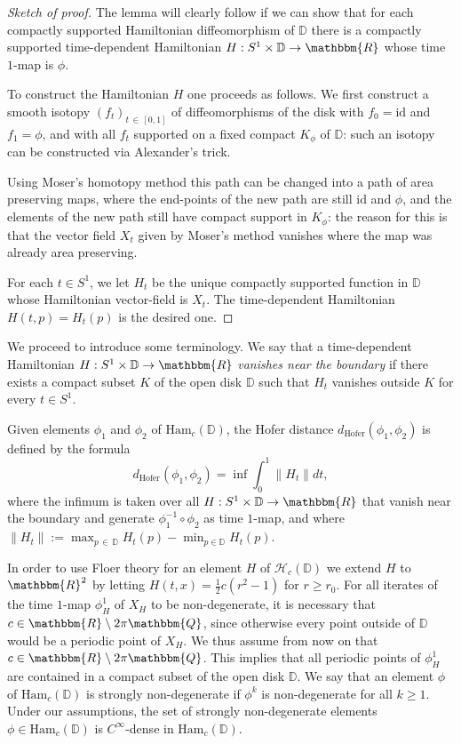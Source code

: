 \documentclass[AHL,Unicode,longabstracts,published]{cedram}
\newcommand{\Q}{\mathbbm{Q}}
\newcommand{\R}{\mathbbm{R}}
\newcommand{\D}{\mathbb{D}}
\newcommand{\Ham}{\mathrm{Ham}}
\newcommand{\hofer}{\mathrm{Hofer}}
\newcommand{\rid}{\mathrm{id}}
\newcommand{\clH}{\mathcal{H}}
\newcommand{\hofer}{\mathrm{Hofer}}
\begin{document}
\begin{proof}[Sketch of proof]
The lemma will clearly follow if we can show that for each compactly supported Hamiltonian diffeomorphism of $\D$ there is a compactly supported time-dependent Hamiltonian $H:S^1 \times \D \to \R$ whose time $1$-map is $\phi$.

To construct the Hamiltonian $H$ one proceeds as follows. We first construct a smooth isotopy $(f_t)_{t\,\in\,[0,1]}$ of diffeomorphisms of the disk with $f_0 = \rid$ and $ f_1=\phi$, and with all $f_t$ supported on a fixed compact $K_{\phi}$ of $\D$: such an isotopy can be constructed via Alexander's trick.

Using Moser's homotopy method this path can be changed into a path of area preserving maps, where the end-points of the new path are still $\rid$ and $\phi$, and the elements of the new path still have compact support in $K_{\phi}$: the reason for this is that the vector field $X_t$ given by Moser's method vanishes where the map was already area preserving.

For each $t \in S^1$, we let $H_t$ be the unique compactly supported function in $\D$ whose Hamiltonian vector-field is $X_t$. The time-dependent Hamiltonian $H(t,p)= H_t(p)$ is the desired one.
\end{proof}




We proceed to introduce some terminology. We say that a time-dependent Hamiltonian $H: S^1 \times \D \to \R$ \emph{vanishes near the boundary} if there exists a compact subset $K$ of the open disk $\D$ such that $H_t$ vanishes outside $K$ for every $t\in S^1$.

Given elements $\phi_1$ and $\phi_2$ of $\Ham_c(\D)$, the Hofer distance $d_{\hofer}(\phi_1,\phi_2)$ is defined by the formula
\begin{equation}
d_{\hofer}(\phi_1,\phi_2) = \inf \int_{0}^1 \| H_t \|dt,
\end{equation}
where the infimum is taken over all $H:S^1 \times \D \to \R$ that vanish near the boundary and generate $\phi_1^{-1}\circ \phi_2$ as time $1$-map, and where $\| H_t \|:= \max_{p\,\in\,\D} H_t(p) - \min_{p \in \D} H_t(p)$.

In order to use Floer theory for an element $H$ of $\clH_c(\D)$ we extend $H$ to $\R^2$ by letting ${H}(t,x) = \frac{1}{2}c(r^2-1)$ for $r\geq r_0$. For all iterates of the time $1$-map $\phi_H^1$ of $X_H$ to be non-degenerate, it is necessary that $c \in \R \setminus 2 \pi \Q$, since otherwise every point outside of $\D$ would be a periodic point of $X_H$. We thus assume from now on that $c \in \R \setminus 2 \pi \Q$. This implies that all periodic points of $\phi_H^1$ are contained in a compact subset of the open disk $\D$. We say that an element $\phi$ of $\Ham_c(\D)$ is strongly non-degenerate if $\phi^k$ is non-degenerate for all $k\geq 1$. Under our assumptions, the set of strongly non-degenerate elements $\phi \in \Ham_c(\D)$ is $C^\infty$-dense in $\Ham_c(\D)$.
\end{document}
